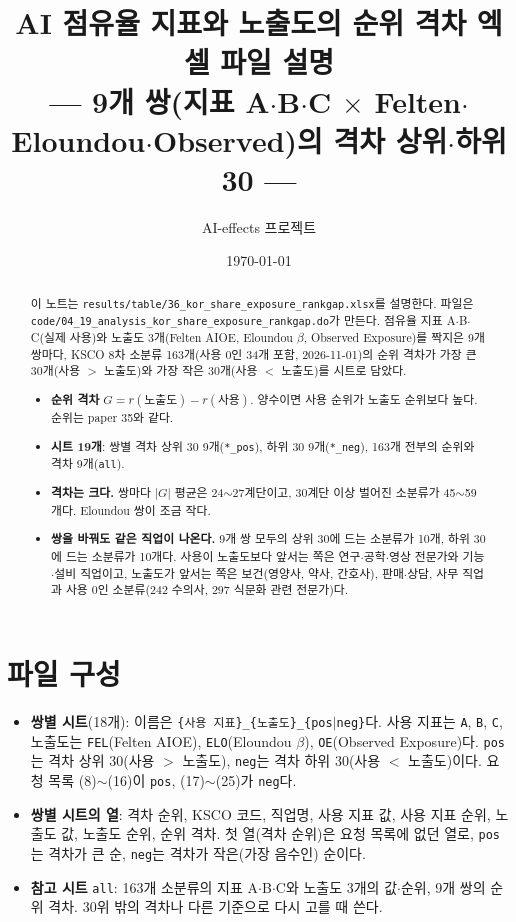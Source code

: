 \documentclass[11pt]{article}
\title{AI 점유율 지표와 노출도의 순위 격차 엑셀 파일 설명\\[2mm]
\large --- 9개 쌍(지표 A$\cdot$B$\cdot$C $\times$ Felten$\cdot$Eloundou$\cdot$Observed)의 격차 상위$\cdot$하위 30 ---}
\author{AI-effects 프로젝트}
\date{\today}
\begin{document}
\maketitle

\begin{abstract}
\noindent 이 노트는 \texttt{results/table/36\_kor\_share\_exposure\_rankgap.xlsx}를 설명한다. 파일은 \texttt{code/04\_19\_analysis\_kor\_share\_exposure\_rankgap.do}가 만든다. 점유율 지표 A$\cdot$B$\cdot$C(실제 사용)와 노출도 3개(Felten AIOE\parencite{felten-2023-how-will-language-modelers-like-chatgpt}, Eloundou $\beta$\parencite{eloundou-2023-gpts-are-gpts-an-early}, Observed Exposure\parencite{massenkoff-2026-labor-market-impacts-of-ai})를 짝지은 9개 쌍마다, KSCO 8차 소분류 163개(사용 0인 34개 포함, 2026-11-01)의 순위 격차가 가장 큰 30개(사용 $>$ 노출도)와 가장 작은 30개(사용 $<$ 노출도)를 시트로 담았다.
\begin{itemize}[leftmargin=*]
  \item \textbf{순위 격차} $G = r(\text{노출도}) - r(\text{사용})$. 양수이면 사용 순위가 노출도 순위보다 높다. 순위는 paper 35와 같다.
  \item \textbf{시트 19개}: 쌍별 격차 상위 30 9개(\texttt{*\_pos}), 하위 30 9개(\texttt{*\_neg}), 163개 전부의 순위와 격차 9개(\texttt{all}).
  \item \textbf{격차는 크다.} 쌍마다 $|G|$ 평균은 24$\sim$27계단이고, 30계단 이상 벌어진 소분류가 45$\sim$59개다. Eloundou 쌍이 조금 작다.
  \item \textbf{쌍을 바꿔도 같은 직업이 나온다.} 9개 쌍 모두의 상위 30에 드는 소분류가 10개, 하위 30에 드는 소분류가 10개다. 사용이 노출도보다 앞서는 쪽은 연구$\cdot$공학$\cdot$영상 전문가와 기능$\cdot$설비 직업이고, 노출도가 앞서는 쪽은 보건(영양사, 약사, 간호사), 판매$\cdot$상담, 사무 직업과 사용 0인 소분류(242 수의사, 297 식문화 관련 전문가)다.
\end{itemize}
\end{abstract}

\section{파일 구성}

\begin{itemize}[leftmargin=*]
  \item \textbf{쌍별 시트}(18개): 이름은 \texttt{\{사용 지표\}\_\{노출도\}\_\{pos$|$neg\}}다. 사용 지표는 \texttt{A}, \texttt{B}, \texttt{C}, 노출도는 \texttt{FEL}(Felten AIOE), \texttt{ELO}(Eloundou $\beta$), \texttt{OE}(Observed Exposure)다. \texttt{pos}는 격차 상위 30(사용 $>$ 노출도), \texttt{neg}는 격차 하위 30(사용 $<$ 노출도)이다. 요청 목록 (8)$\sim$(16)이 \texttt{pos}, (17)$\sim$(25)가 \texttt{neg}다.
  \item \textbf{쌍별 시트의 열}: 격차 순위, KSCO 코드, 직업명, 사용 지표 값, 사용 지표 순위, 노출도 값, 노출도 순위, 순위 격차. 첫 열(격차 순위)은 요청 목록에 없던 열로, \texttt{pos}는 격차가 큰 순, \texttt{neg}는 격차가 작은(가장 음수인) 순이다.
  \item \textbf{참고 시트} \texttt{all}: 163개 소분류의 지표 A$\cdot$B$\cdot$C와 노출도 3개의 값$\cdot$순위, 9개 쌍의 순위 격차. 30위 밖의 격차나 다른 기준으로 다시 고를 때 쓴다.
\end{itemize}
\end{document}

